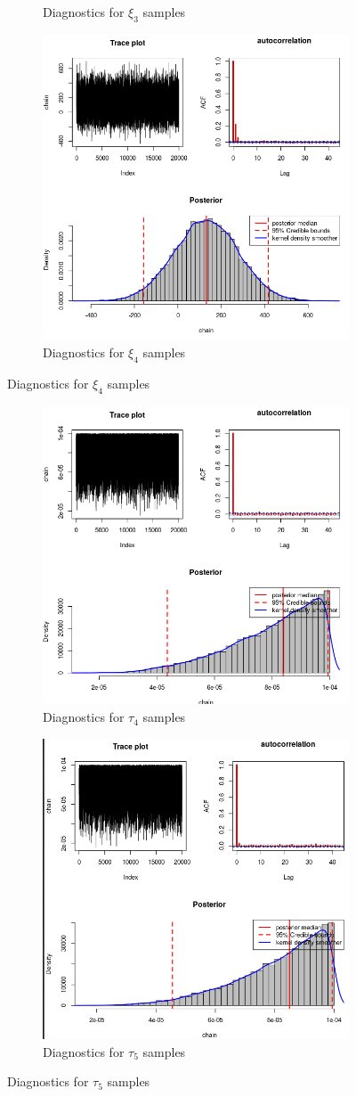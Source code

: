 \documentclass[11pt,twoside]{report}
\begin{document}
\begin{figure}[H]
\begin{subfigure}[H]{0.50\linewidth}
		\caption{Diagnostics for $ \xi_3 $ samples}
		\label{fig:xi_1_3}
	\end{subfigure}
	\hfill
	\begin{subfigure}[H]{0.50\linewidth}
		\centering
		\includegraphics[width=58 mm]{pictures/xi_4_2.png}
		\caption{Diagnostics for $ \xi_4 $ samples}
		\label{fig:xi_2_4}
	\end{subfigure}%
\end{figure}

\begin{figure}
\begin{subfigure}[H]{0.50\linewidth}
	\centering
	\includegraphics[width=58 mm]{pictures/tau_4.png}
	\caption{Diagnostics for $ \tau_4 $ samples}
	\label{fig:tau_4}
\end{subfigure}
\hfill
\begin{subfigure}[H]{0.50\linewidth}
	\centering
	\includegraphics[width=58 mm]{pictures/tau_5.png}
	\caption{Diagnostics for $ \tau_5 $ samples}
	\label{fig:tau_5}
\end{subfigure}%
\end{figure}
\end{document}
